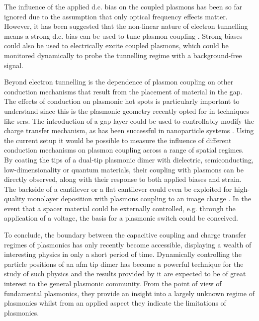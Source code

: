 \documentclass[12pt, a4paper, oneside]{book}
\begin{document}
The influence of the applied d.c. bias on the coupled plasmons has been so far ignored due to the assumption that only optical frequency effects matter. However, it has been suggested that the non-linear nature of electron tunnelling means a strong d.c. bias can be used to tune plasmon coupling \cite{}. Strong biases could also be used to electrically excite coupled plasmons, which could be monitored dynamically to probe the tunnelling regime with a background-free signal.

Beyond electron tunnelling is the dependence of plasmon coupling on other conduction mechanisms that result from the placement of material in the gap. The effects of conduction on plasmonic hot spots is particularly important to understand since this is the plasmonic geometry recently opted for in techniques like \gls{sers}. The introduction of a gap layer could be used to controllably modify the charge transfer mechanism, as has been successful in nanoparticle systems \cite{benz2014}. Using the current setup it would be possible to measure the influence of different conduction mechanisms on plasmon coupling across a range of spatial regimes. By coating the tips of a dual-tip plasmonic dimer with dielectric, semiconducting, low-dimensionality or quantum materials, their coupling with plasmons can be directly observed, along with their response to both applied biases and strain. The backside of a cantilever or a flat cantilever could even be exploited for high-quality monolayer deposition with plasmons coupling to an image charge \cite{mertens2013, benz2014}. In the event that a spacer material could be externally controlled, e.g. through the application of a voltage, the basis for a plasmonic switch could be conceived.

To conclude, the boundary between the capacitive coupling and charge transfer regimes of plasmonics has only recently become accessible, displaying a wealth of interesting physics in only a short period of time. Dynamically controlling the particle positions of an \gls{afm} tip dimer has become a powerful technique for the study of such physics and the results provided by it are expected to be of great interest to the general plasmonic community. From the point of view of fundamental plasmonics, they provide an insight into a largely unknown regime of plasmonics whilst from an applied aspect they indicate the limitations of plasmonics.

\ifstandalone
\begin{singlespace}
\fontsize{8pt}{1em}\selectfont
\printbibliography[notcategory=fullcited]
\end{singlespace}
\fi
\end{document}
